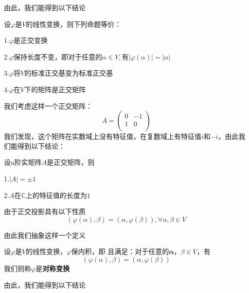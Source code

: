 \documentclass[lang=cn,10pt]{elegantbook}
\begin{document}
	由此，我们能得到以下结论
	\begin{conclusion}
		设$\varphi $是$V$的线性变换，则下列命题等价：
		
		1.$\varphi $是正交变换
		
		2.$\varphi $保持长度不变，即对于任意的$\alpha \in V,\text{有}|\varphi (\alpha)|=|\alpha|$
		
		3.$\varphi $将$V$的标准正交基变为标准正交基
		
		4.$\varphi $在$V$下的矩阵是正交矩阵
	\end{conclusion}
	
	我们考虑这样一个正交矩阵：
	\begin{equation*}
		A=\left( \begin{matrix}
			0&		-1\\
			1&		0\\
		\end{matrix} \right) 
	\end{equation*}
	我们发现，这个矩阵在实数域上没有特征值，在复数域上有特征值$i$和$-i$，由此我们能得到以下结论：
	\begin{conclusion}
		设n阶实矩阵$A$是正交矩阵，则
		
		1.$|A|=\pm1$
		
		2.$
		A\text{在}\mathbb{C} \text{上的特征值的长度为}1
		$
	\end{conclusion}
	
	由于正交投影具有以下性质
	\begin{equation*}
		(\varphi(\alpha),\beta)=(\alpha,\varphi(\beta)), \forall \alpha,\beta \in V
	\end{equation*}
	
	由此我们抽象这样一个定义
	\begin{definition}
		设$\varphi $是$V$的线性变换，$\varphi $保内积，即	$\text{且满足：对于任意的}\boldsymbol{\alpha }\text{，}\beta \in V\text{，有}
		$
		\begin{equation*}
			 \left( \varphi \left( \alpha \right) ,\beta \right) =\left( \alpha ,\varphi \left( \beta \right) \right) 
		\end{equation*}
		我们则称$\varphi $是\textbf{对称变换}
	\end{definition}
	
	由此，我们能得到以下结论
	
\end{document}
